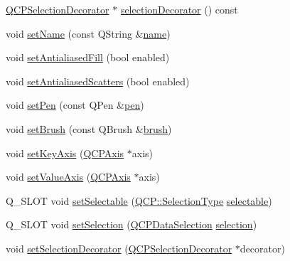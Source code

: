 \begin{DoxyCompactItemize}
\item 
\hyperlink{class_q_c_p_selection_decorator}{Q\+C\+P\+Selection\+Decorator} $\ast$ \hyperlink{class_q_c_p_abstract_plottable_a33e6f2b8d6008e4ac59ff8d92b509c97}{selection\+Decorator} () const 
\item 
void \hyperlink{class_q_c_p_abstract_plottable_ab79c7ba76bc7fa89a4b3580e12149f1f}{set\+Name} (const Q\+String \&\hyperlink{class_q_c_p_abstract_plottable_a1affc1972938e4364a9325e4e4e4dcea}{name})
\item 
void \hyperlink{class_q_c_p_abstract_plottable_a089d6b5577120239b55c39ed27c39536}{set\+Antialiased\+Fill} (bool enabled)
\item 
void \hyperlink{class_q_c_p_abstract_plottable_a2f03f067ede2ed4da6f7d0e4777a3f02}{set\+Antialiased\+Scatters} (bool enabled)
\item 
void \hyperlink{class_q_c_p_abstract_plottable_ab74b09ae4c0e7e13142fe4b5bf46cac7}{set\+Pen} (const Q\+Pen \&\hyperlink{class_q_c_p_abstract_plottable_a41d060007cc6b3037c9c04d22d0c0398}{pen})
\item 
void \hyperlink{class_q_c_p_abstract_plottable_a7a4b92144dca6453a1f0f210e27edc74}{set\+Brush} (const Q\+Brush \&\hyperlink{class_q_c_p_abstract_plottable_aa74cdceb9c7286ef116fbfa58e0326e7}{brush})
\item 
void \hyperlink{class_q_c_p_abstract_plottable_a8524fa2994c63c0913ebd9bb2ffa3920}{set\+Key\+Axis} (\hyperlink{class_q_c_p_axis}{Q\+C\+P\+Axis} $\ast$axis)
\item 
void \hyperlink{class_q_c_p_abstract_plottable_a71626a07367e241ec62ad2c34baf21cb}{set\+Value\+Axis} (\hyperlink{class_q_c_p_axis}{Q\+C\+P\+Axis} $\ast$axis)
\item 
Q\+\_\+\+S\+L\+OT void \hyperlink{class_q_c_p_abstract_plottable_ac238d6e910f976f1f30d41c2bca44ac3}{set\+Selectable} (\hyperlink{namespace_q_c_p_ac6cb9db26a564b27feda362a438db038}{Q\+C\+P\+::\+Selection\+Type} \hyperlink{class_q_c_p_abstract_plottable_a9369b0da736b88dea0ee6b7345f8ea74}{selectable})
\item 
Q\+\_\+\+S\+L\+OT void \hyperlink{class_q_c_p_abstract_plottable_a219bc5403a9d85d3129165ec3f5ae436}{set\+Selection} (\hyperlink{class_q_c_p_data_selection}{Q\+C\+P\+Data\+Selection} \hyperlink{class_q_c_p_abstract_plottable_a6fcea502826afbaab2568bd3ebc61b4b}{selection})
\item 
void \hyperlink{class_q_c_p_abstract_plottable_a20e266ad646f8c4a7e4631040510e5d9}{set\+Selection\+Decorator} (\hyperlink{class_q_c_p_selection_decorator}{Q\+C\+P\+Selection\+Decorator} $\ast$decorator)

\end{DoxyCompactItemize}
